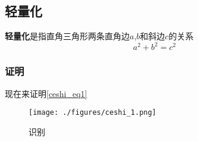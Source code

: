 
\subsection{轻量化}
\textbf{轻量化}是指直角三角形两条直角边$a$,$b$和斜边$c$的关系
\begin{equation}\label{ceshi_eq1}
a^2+b^2=c^2
\end{equation}
\subsubsection{证明}
现在来证明\autoref{ceshi_eq1} 
\begin{figure}[ht]
\centering
\texttt{[image: ./figures/ceshi\_1.png]}
\caption{识别} \label{ceshi_fig1}
\end{figure}
